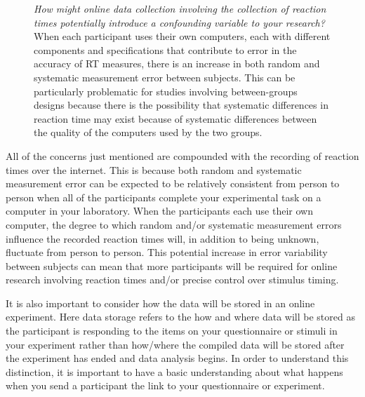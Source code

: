 \begin{figure}
\begin{tcolorbox}[width=.95\textwidth,colback=yellow!5!white,colframe=yellow!50!black,
  colbacktitle=yellow!75!black,title=Food For Thought,grow to right by=1cm]
  \emph{How might online data collection involving the collection of reaction times potentially introduce a confounding variable to your research?}
  \tcblower
  When each participant uses their own computers, each with different components and specifications that contribute to error in the accuracy of RT measures, there is an increase in both random and systematic measurement error between subjects. This can be particularly problematic for studies involving between-groups designs because there is the possibility that systematic differences in reaction time may exist because of systematic differences between the quality of the computers used by the two groups. 
\end{tcolorbox}
\end{figure}
 All of the concerns just mentioned are compounded with the recording of reaction times over the internet. This is because both random and systematic measurement error can be expected to be relatively consistent from person to person when all of the participants complete your experimental task on a computer in your laboratory.  When the participants each use their own computer, the degree to which random and/or systematic measurement errors influence the recorded reaction times will, in addition to being unknown, fluctuate from person to person. This potential increase in error variability between subjects can mean that more participants will be required for online research involving reaction times and/or precise control over stimulus timing.

It is also important to consider how the data will be stored in an online experiment.  Here data storage refers to the how and where data will be stored as the participant is responding to the items on your questionnaire or stimuli in your experiment rather than how/where the compiled data will be stored after the experiment has ended and data analysis begins.  In order to understand this distinction, it is important to have a basic understanding about what happens when you send a participant the link to your questionnaire or experiment.

